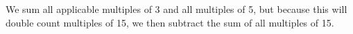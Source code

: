 \documentclass{article}
\begin{document}
We sum all applicable multiples of 3 and all multiples of 5, but because this will double count multiples of 15, we then subtract the sum of all multiples of 15.
\end{document}
